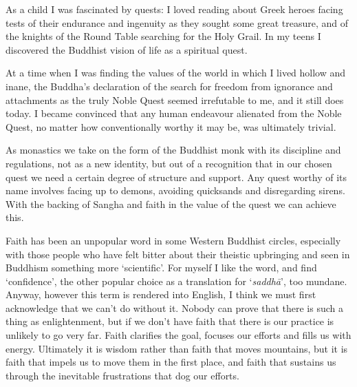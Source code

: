 
As a child I was fascinated by quests: I loved reading about Greek
heroes facing tests of their endurance and ingenuity as they sought some
great treasure, and of the knights of the Round Table searching for the
Holy Grail. In my teens I discovered the Buddhist vision of life as a
spiritual quest.

At a time when I was finding the values of the world in
which I lived hollow and inane, the Buddha's declaration of the search
for freedom from ignorance and attachments as the truly Noble Quest
seemed irrefutable to me, and it still does today. I became convinced
that any human endeavour alienated from the Noble Quest, no matter how
conventionally worthy it may be, was ultimately trivial. 

As monastics we take on the form of the Buddhist monk with its
discipline and regulations, not as a new identity, but out of a
recognition that in our chosen quest we need a certain degree of
structure and support. Any quest worthy of its name involves facing up
to demons, avoiding quicksands and disregarding sirens. With the backing
of Sangha and faith in the value of the quest we can achieve this. 

Faith has been an unpopular word in some Western Buddhist circles, 
especially with those people who have felt bitter about their theistic
upbringing and seen in Buddhism something more `scientific'. For myself
I like the word, and find `confidence', the other popular choice as a
translation for `\emph{saddhā}', too mundane. Anyway, however this term
is rendered into English, I think we must first acknowledge that we
can't do without it. Nobody can prove that there is such a thing as
enlightenment, but if we don't have faith that there is our practice is
unlikely to go very far. Faith clarifies the goal, focuses our efforts
and fills us with energy. Ultimately it is wisdom rather than faith that
moves mountains, but it is faith that impels us to move them in the
first place, and faith that sustains us through the inevitable
frustrations that dog our efforts. 

